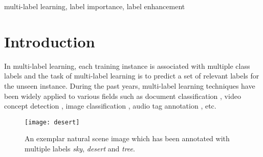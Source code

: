 \documentclass[conference]{IEEEtran}
\begin{document}
\begin{abstract}
\end{abstract}

\begin{IEEEkeywords}
multi-label learning, label importance, label enhancement
\end{IEEEkeywords}

\section{Introduction}
In multi-label learning, each training instance is associated with multiple class labels and the task of multi-label learning is to predict a set of relevant labels for the unseen instance. During the past years, multi-label learning techniques have been widely applied to various fields such as document classification \cite{rubin2012statistical}, video concept detection \cite{wang2011transductive}, image classification \cite{cabral2011matrix}, audio tag annotation \cite{lo2011cost}, etc.

\begin{figure}[h]
\centering\texttt{[image: desert]}
\caption{An exemplar natural scene image which has been annotated with multiple labels \emph{sky}, \emph{desert} and \emph{tree}.}
\end{figure}
\end{document}
